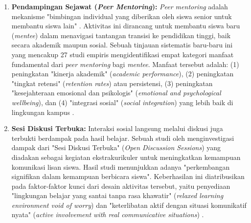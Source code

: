 \begin{enumerate}
    \item \textbf{Pendampingan Sejawat (\textit{Peer Mentoring}):} \textit{Peer mentoring} adalah mekanisme "bimbingan individual
    yang diberikan oleh siswa senior untuk membantu siswa lain" \autocite{Le2024}.
    Aktivitas ini dirancang untuk membantu siswa baru (\textit{mentee}) dalam
    menavigasi tantangan transisi ke pendidikan tinggi, baik secara akademik maupun
    sosial. Sebuah tinjauan sistematis baru-baru ini yang mencakup 27 studi empiris
    mengidentifikasi empat kategori manfaat fundamental dari \textit{peer mentoring}
    bagi \textit{mentee}. Manfaat tersebut adalah: (1) peningkatan "kinerja akademik"
    (\textit{academic performance}), (2) peningkatan "tingkat retensi"
    (\textit{retention rates}) atau persistensi, (3) peningkatan "kesejahteraan
    emosional dan psikologis" (\textit{emotional and psychological wellbeing}), dan
    (4) "integrasi sosial" (\textit{social integration}) yang lebih baik di
    lingkungan kampus \autocite{Le2024}.
    
    \item \textbf{Sesi Diskusi Terbuka:} Interaksi sosial langsung melalui diskusi juga terbukti berdampak pada hasil
    belajar. Sebuah studi oleh \textcite{DaifAllah2016} menginvestigasi dampak dari
    "Sesi Diskusi Terbuka" (\textit{Open Discussion Sessions}) yang diadakan sebagai
    kegiatan ekstrakurikuler untuk meningkatkan kemampuan komunikasi lisan siswa.
    Hasil studi menunjukkan adanya "perkembangan signifikan dalam kemampuan berbicara
    siswa". Keberhasilan ini diatribusikan pada
    faktor-faktor kunci dari desain aktivitas tersebut, yaitu penyediaan "lingkungan
    belajar yang santai tanpa rasa khawatir" (\textit{relaxed learning environment
    void of worry}) dan "keterlibatan aktif dengan situasi komunikatif nyata"
    (\textit{active involvement with real communicative situations})
    \autocite{DaifAllah2016}.


\end{enumerate}
